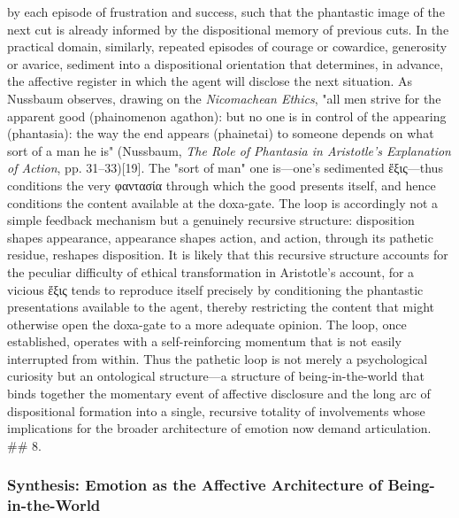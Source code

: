 \documentclass{article}
\begin{document}
by each episode of frustration and success, such that the phantastic image of the next cut is already informed by the dispositional memory of previous cuts. In the practical domain, similarly, repeated episodes of courage or cowardice, generosity or avarice, sediment into a dispositional orientation that determines, in advance, the affective register in which the agent will disclose the next situation. As Nussbaum observes, drawing on the \textit{Nicomachean Ethics}, "all men strive for the apparent good (phainomenon agathon): but no one is in control of the appearing (phantasia): the way the end appears (phainetai) to someone depends on what sort of a man he is" (Nussbaum, \textit{The Role of Phantasia in Aristotle's Explanation of Action}, pp. 31–33)[19]. The "sort of man" one is—one's sedimented ἕξις—thus conditions the very φαντασία through which the good presents itself, and hence conditions the content available at the doxa-gate. The loop is accordingly not a simple feedback mechanism but a genuinely recursive structure: disposition shapes appearance, appearance shapes action, and action, through its pathetic residue, reshapes disposition. It is likely that this recursive structure accounts for the peculiar difficulty of ethical transformation in Aristotle's account, for a vicious ἕξις tends to reproduce itself precisely by conditioning the phantastic presentations available to the agent, thereby restricting the content that might otherwise open the doxa-gate to a more adequate opinion. The loop, once established, operates with a self-reinforcing momentum that is not easily interrupted from within. Thus the pathetic loop is not merely a psychological curiosity but an ontological structure—a structure of being-in-the-world that binds together the momentary event of affective disclosure and the long arc of dispositional formation into a single, recursive totality of involvements whose implications for the broader architecture of emotion now demand articulation. ## 8. 

\subsubsection*{Synthesis: Emotion as the Affective Architecture of Being-in-the-World}
\end{document}
